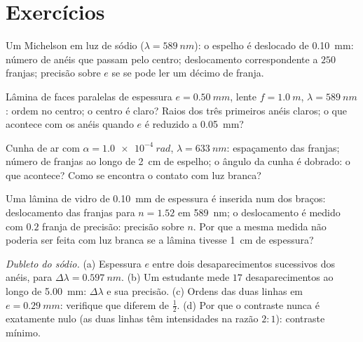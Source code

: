 \section{Exercícios}

\begin{exercise}[$\star$]\label{exo:b2:michelson:1}
Um Michelson em luz de sódio ($\lambda = \qty{589}{nm}$): o espelho é deslocado de
\qty{0.10}{mm}: número de anéis que passam pelo centro; deslocamento
correspondente a $250$ franjas; precisão sobre $e$ se se pode ler um décimo de
franja.
\end{exercise}

\begin{exercise}[$\star$]\label{exo:b2:michelson:2}
Lâmina de faces paralelas de espessura $e = \qty{0.50}{mm}$, lente $f = \qty{1.0}{m}$, $\lambda =
\qty{589}{nm}$: ordem no centro; o centro é claro? Raios dos
três primeiros anéis claros; o que acontece com os anéis quando $e$ é reduzido
a \qty{0.05}{mm}?
\end{exercise}

\begin{exercise}[$\star$]\label{exo:b2:michelson:3}
Cunha de ar com $\alpha = \qty{1.0e-4}{rad}$, $\lambda = \qty{633}{nm}$: espaçamento das franjas;
número de franjas ao longo de \qty{2}{cm} de espelho; o ângulo da cunha é
dobrado: o que acontece? Como se encontra o contato com luz branca?
\end{exercise}

\begin{exercise}[$\star$]\label{exo:b2:michelson:4}
Uma lâmina de vidro de \qty{0.10}{mm} de espessura é inserida num dos braços: deslocamento das franjas para
$n = 1.52$ em \qty{589}{nm}; o deslocamento é medido com $0.2$ franja de precisão: precisão
sobre $n$. Por que a mesma medida não poderia ser feita com luz branca
se a lâmina tivesse \qty{1}{cm} de espessura?
\end{exercise}

\begin{exercise}[$\star\star$]\label{exo:b2:michelson:5}
\emph{Dubleto do sódio.} (a) Espessura $e$ entre dois desaparecimentos
sucessivos dos anéis, para $\Delta\lambda = \qty{0.597}{nm}$. (b) Um estudante
mede $17$ desaparecimentos ao longo de \qty{5.00}{mm}: $\Delta\lambda$ e sua precisão.
(c) Ordens das duas linhas em $e = \qty{0.29}{mm}$: verifique que diferem de
$\tfrac12$. (d) Por que o contraste nunca é exatamente nulo (as duas linhas têm
intensidades na razão $2 : 1$): contraste mínimo.
\end{exercise}

